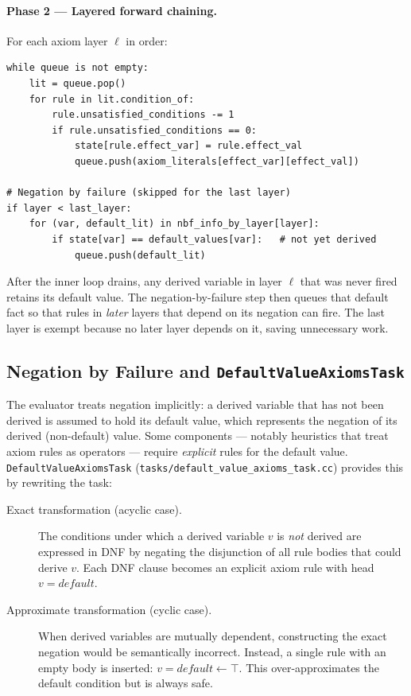 \documentclass[11pt,a4paper]{article}
\begin{document}
\paragraph{Phase 2 — Layered forward chaining.}
For each axiom layer $\ell$ in order:

\begin{lstlisting}[caption={Per-layer evaluation pseudocode}]
while queue is not empty:
    lit = queue.pop()
    for rule in lit.condition_of:
        rule.unsatisfied_conditions -= 1
        if rule.unsatisfied_conditions == 0:
            state[rule.effect_var] = rule.effect_val
            queue.push(axiom_literals[effect_var][effect_val])

# Negation by failure (skipped for the last layer)
if layer < last_layer:
    for (var, default_lit) in nbf_info_by_layer[layer]:
        if state[var] == default_values[var]:   # not yet derived
            queue.push(default_lit)
\end{lstlisting}

After the inner loop drains, any derived variable in layer $\ell$ that was
never fired retains its default value.  The negation-by-failure step then
queues that default fact so that rules in \emph{later} layers that depend on
its negation can fire.  The last layer is exempt because no later layer
depends on it, saving unnecessary work.

\subsection{Negation by Failure and \texttt{DefaultValueAxiomsTask}}

The evaluator treats negation implicitly: a derived variable that has not been
derived is assumed to hold its default value, which represents the negation of
its derived (non-default) value.  Some components — notably heuristics that
treat axiom rules as operators — require \emph{explicit} rules for the default
value.  \texttt{DefaultValueAxiomsTask}
(\texttt{tasks/default\_value\_axioms\_task.cc}) provides this by rewriting the
task:

\begin{description}
  \item[Exact transformation (acyclic case).] The conditions under which a
        derived variable $v$ is \emph{not} derived are expressed in DNF by
        negating the disjunction of all rule bodies that could derive $v$.
        Each DNF clause becomes an explicit axiom rule with head
        $v = \mathit{default}$.

  \item[Approximate transformation (cyclic case).] When derived variables are
        mutually dependent, constructing the exact negation would be
        semantically incorrect.  Instead, a single rule with an empty body is
        inserted: $v = \mathit{default} \leftarrow \top$.  This
        over-approximates the default condition but is always safe.
\end{description}
\end{document}
